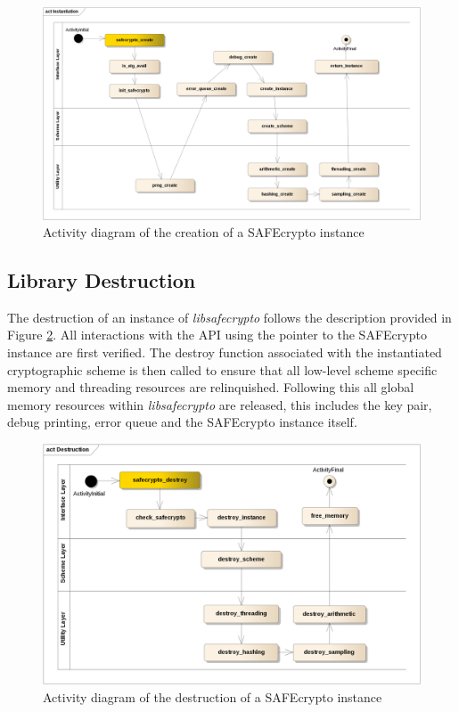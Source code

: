 \begin{figure}[H]
\centering
\includegraphics[width=\textwidth]{activity_instantiation.png}
\caption{Activity diagram of the creation of a SAFEcrypto instance}
\label{fig:safecrypto_activity}
\end{figure}


\subsection{Library Destruction}

The destruction of an instance of \textit{libsafecrypto} follows the description provided in Figure \ref{fig:safecrypto_destruct_activity}. All interactions with the API using the pointer to the SAFEcrypto instance are first verified. The destroy function associated with the instantiated cryptographic scheme is then called to ensure that all low-level scheme specific memory and threading resources are relinquished. Following this all global memory resources within \textit{libsafecrypto} are released, this includes the key pair, debug printing, error queue and the SAFEcrypto instance itself.

\begin{figure}[H]
\centering
\includegraphics[width=\textwidth]{activity_destruction.png}
\caption{Activity diagram of the destruction of a SAFEcrypto instance}
\label{fig:safecrypto_destruct_activity}
\end{figure}


